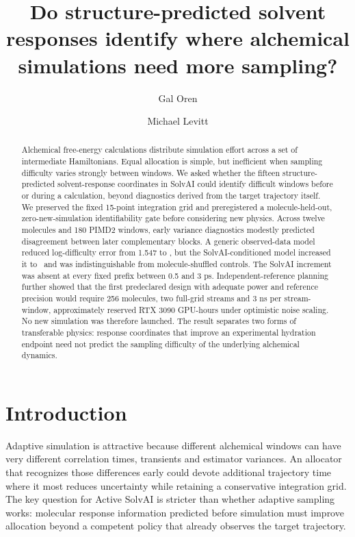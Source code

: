 \documentclass[11pt]{article}
\title{Do structure-predicted solvent responses identify where alchemical simulations need more sampling?}
\author{Gal Oren \and Michael Levitt}
\date{}
\begin{document}
\maketitle

\begin{abstract}
Alchemical free-energy calculations distribute simulation effort across a set of
intermediate Hamiltonians. Equal allocation is simple, but inefficient when sampling
difficulty varies strongly between windows. We asked whether the fifteen
structure-predicted solvent-response coordinates in SolvAI could identify difficult
windows before or during a calculation, beyond diagnostics derived from the target
trajectory itself. We preserved the fixed 15-point integration grid and preregistered
a molecule-held-out, zero-new-simulation identifiability gate before considering new
physics. Across twelve molecules and 180 PIMD2 windows, early variance diagnostics
modestly predicted disagreement between later complementary blocks. A generic
observed-data model reduced log-difficulty error from 1.547 to \GateGenericMAE, but the
SolvAI-conditioned model increased it to \GateSolvAIMAE\ and was indistinguishable from
molecule-shuffled controls. The SolvAI increment was absent at every fixed prefix
between 0.5 and 3 ps. Independent-reference planning further showed that the first
predeclared design with adequate power and reference precision would require 256
molecules, two full-grid streams and 3 ns per stream-window, approximately
\MinimumDesignReservedGPU
reserved RTX 3090 GPU-hours under optimistic noise scaling. No new simulation was
therefore launched. The result separates two forms of transferable physics: response
coordinates that improve an experimental hydration endpoint need not predict the
sampling difficulty of the underlying alchemical dynamics.
\end{abstract}

\section{Introduction}

Adaptive simulation is attractive because different alchemical windows can have very
different correlation times, transients and estimator variances. An allocator that
recognizes those differences early could devote additional trajectory time where it
most reduces uncertainty while retaining a conservative integration grid. The key
question for Active SolvAI is stricter than whether adaptive sampling works: molecular
response information predicted before simulation must improve allocation beyond a
competent policy that already observes the target trajectory.
\end{document}
